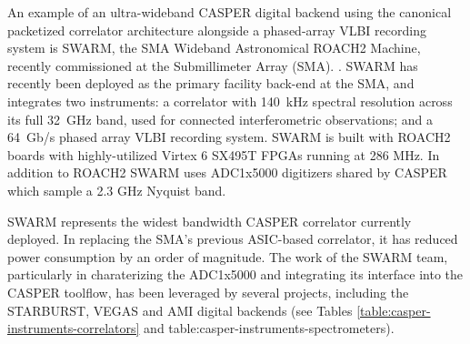 \documentclass{ws-jai}
\begin{document}
An example of an ultra-wideband CASPER digital backend using the canonical packetized correlator architecture alongside a phased-array VLBI recording system is SWARM, the SMA Wideband Astronomical ROACH2 Machine, recently commissioned at the Submillimeter Array (SMA). \citep{swarm}. SWARM has recently been deployed as the primary facility back-end at the SMA, and integrates two instruments: a correlator with 140~kHz spectral resolution across its full 32~GHz band, used for connected interferometric observations; and a 64~Gb/s phased array VLBI recording system. SWARM is built with ROACH2 boards with highly-utilized Virtex 6 SX495T FPGAs running at 286 MHz. In addition to ROACH2 SWARM uses ADC1x5000 digitizers shared by CASPER which sample a 2.3 GHz Nyquist band.

SWARM represents the widest bandwidth CASPER correlator currently deployed. In replacing the SMA's previous ASIC-based correlator, it has reduced power consumption by an order of magnitude. The work of the SWARM team, particularly in charaterizing the ADC1x5000 \citep{adc5g} and integrating its interface into the CASPER toolflow, has been leveraged by several projects, including the STARBURST, VEGAS and AMI digital backends (see Tables \ref{table:casper-instruments-correlators} and {table:casper-instruments-spectrometers}).
\end{document}
